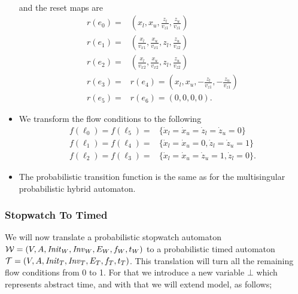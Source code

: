 \begin{ex}
\begin{itemize}
\begin{align*}
    \end{align*}
    and the reset maps are
    \begin{align*}
        r(e_{0})= & (x_{l},x_{u},\frac{z_{l}}{v_{z1}},\frac{z_{u}}{v_{z1}})\\
        r(e_{1})= & (\frac{x_{l}}{v_{x1}},\frac{x_{u}}{v_{x1}},z_{l},\frac{z_{u}}{v_{z2}}) \\
        r(e_{2})= & (\frac{x_{l}}{v_{x2}},\frac{x_{u}}{v_{x2}},z_{l},\frac{z_{u}}{v_{z2}}) \\
        r(e_{3})= & r(e_{4})=(x_{l},x_{u},-\frac{z_{l}}{v_{z1}},-\frac{z_{u}}{v_{z1}})\\
        r(e_{5})=& r(e_{6})=(0,0,0,0).
    \end{align*}
    \item We transform the flow conditions to the following
    \begin{align*}
        f(\ell_{0})=f(\ell_{5})=& \{\dot{x}_{l}=\dot{x}_{u}=\dot{z}_{l}=\dot{z}_{u}=0\} \\
        f(\ell_{1})=f(\ell_{4})=& \{\dot{x}_{l}=\dot{x}_{u}=0,\dot{z}_{l}=\dot{z}_{u}=1\} \\
        f(\ell_{2})=f(\ell_{3})=& \{\dot{x}_{l}=\dot{x}_{u}=\dot{z}_{u}=1,\dot{z}_{l}=0\}.
    \end{align*}
    \item The probabilistic transition function is the same as for the multisingular probabilistic hybrid automaton.
\end{itemize}
\end{ex}

\subsubsection{Stopwatch To Timed}
We will now translate a probabilistic stopwatch automaton $\mathcal{W} = (V,A,\mathit{Init}_{W},\mathit{Inv}_{W},E_{W},f_{W},t_{W})$ to a probabilistic timed automaton $\mathcal{T} = (V,A,\mathit{Init}_{T},\mathit{Inv}_{T},E_{T},f_{T},t_{T})$. This translation will turn all the remaining flow conditions from 0 to 1. For that we introduce a new variable $\bot$ which represents abstract time, and with that we will extend model, as follows;

